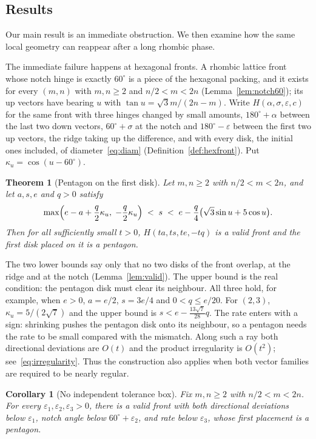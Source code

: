 \documentclass[11pt]{amsart}
\newtheorem{theorem}{Theorem}
\newtheorem{corollary}[lemma]{Corollary}
\theoremstyle{definition}
\newcommand{\eps}{\varepsilon}
\begin{document}
\subsection*{Results} Our main result is an immediate obstruction. We then examine how the
same local geometry can reappear after a long rhombic phase.

The immediate failure happens at hexagonal fronts. A rhombic lattice front whose notch hinge is exactly
$60^\circ$ is a piece of the hexagonal packing, and it exists for every $(m,n)$ with $m,n\ge2$ and
$n/2<m<2n$ (Lemma~\ref{lem:notch60}); its up vectors have bearing $u$ with $\tan u=\sqrt3m/(2n-m)$. Write
$H(\alpha,\sigma,\eps,c)$ for the same front with three hinges changed by small amounts, $180^\circ+\alpha$
between the last two down vectors, $60^\circ+\sigma$ at the notch and $180^\circ-\eps$ between the first two up
vectors, the ridge taking up the difference, and with every disk, the initial ones included, of
diameter~\eqref{eq:diam} (Definition~\ref{def:hexfront}). Put $\kappa_u=\cos(u-60^\circ)$.

\begin{theorem}[Pentagon on the first disk]\label{thm:static}
Let $m,n\ge2$ with $n/2<m<2n$, and let $a,s,e$ and $q>0$ satisfy
\begin{equation}\label{eq:window}
\max\Bigl(e-a+\frac q2\kappa_u,\;-\frac q2\kappa_u\Bigr)\;<\;s\;<\;e-\frac q4\bigl(\sqrt3\sin u+5\cos u\bigr).
\end{equation}
Then for all sufficiently small $t>0$, $H(ta,ts,te,-tq)$ is a valid front and the first disk placed on it is
a pentagon.
\end{theorem}

\noindent The two lower bounds say only that no two disks of the front overlap, at the ridge and at the
notch (Lemma~\ref{lem:valid}). The upper bound is the real condition: the pentagon disk must clear its
neighbour. All three hold, for example, when $e>0$, $a=e/2$, $s=3e/4$ and $0<q\le e/20$. For $(2,3)$, $\kappa_u=5/(2\sqrt7)$ and
the upper bound is $s<e-\tfrac{13\sqrt7}{28}q$.
The rate enters with a sign: shrinking pushes the pentagon disk onto its neighbour, so a pentagon needs the
rate to be small compared with the mismatch. Along such a ray both directional deviations are $O(t)$ and the product irregularity is
$O(t^2)$; see~\eqref{eq:irregularity}. Thus the construction also applies when both vector
families are required to be nearly regular.

\begin{corollary}[No independent tolerance box]\label{cor:GDD}
Fix $m,n\ge2$ with $n/2<m<2n$. For every $\eps_1,\eps_2,\eps_3>0$, there is a valid front
with both directional deviations below $\eps_1$, notch angle below $60^\circ+\eps_2$, and
rate below $\eps_3$, whose first placement is a pentagon.
\end{corollary}
\end{document}

